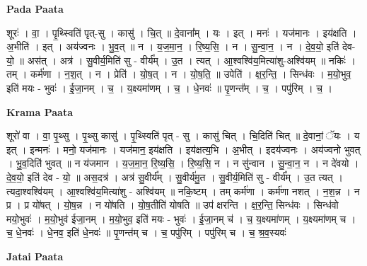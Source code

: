 \documentclass[17pt]{extarticle}
\begin{document}
\textbf{Pada Paata} \newline

शूरः॑ । वा॒ । पृ॒थ्स्विति॑ पृत्-सु । कासु॑ । चि॒त् ॥ दे॒वाना᳚म् । यः । इत् । मनः॑ । यज॑मानः । इय॑क्षति । अ॒भीति॑ । इत् । अय॑ज्वनः । भु॒व॒त् ॥ न । य॒ज॒मा॒न॒ । रि॒ष्य॒सि॒ । न । सु॒न्वा॒न॒ । न । दे॒व॒यो॒ इति॑ देव-यो॒ ॥ अस॑त् । अत्र॑ । सु॒वीर्य॒मिति॑ सु - वीर्य᳚म् । उ॒त । त्यत् । आ॒श्वश्वि॑य॒मित्या॑शु-अश्वि॑यम् ॥ नकिः॑ । तम् । कर्म॑णा । न॒श॒त् । न । प्रेति॑ । यो॒ष॒त् । न । यो॒ष॒ति॒ ॥ उपेति॑ । क्ष॒र॒न्ति॒ । सिन्ध॑वः । म॒यो॒भुव॒ इति॑ मयः - भुवः॑ । ई॒जा॒नम् । च॒ । य॒क्ष्यमा॑णम् । च॒ । धे॒नवः॑ ॥ पृ॒णन्त᳚म् । च॒ । पपु॑रिम् । च॒ ।  \newline


\textbf{Krama Paata} \newline

शूरो॑ वा । वा॒ पृ॒थ्सु । पृ॒थ्सु कासु॑ । पृ॒थ्स्विति॑ पृत् - सु । कासु॑ चित् । चि॒दिति॑ चित् ॥ दे॒वानां॒ ॅयः । य इत् । इन्मनः॑ । मनो॒ यज॑मानः । यज॑मान॒ इय॑क्षति । इय॑क्षत्य॒भि । अ॒भीत् । इदय॑ज्वनः । अय॑ज्वनो भुवत् । भु॒व॒दिति॑ भुवत् ॥ न य॑जमान । य॒ज॒मा॒न॒ रि॒ष्य॒सि॒ । रि॒ष्य॒सि॒ न । न सु॑न्वान । सु॒न्वा॒न॒ न । न दे॑वयो । दे॒व॒यो॒ इति॑ देव - यो॒ ॥ अस॒दत्र॑ । अत्र॑ सु॒वीर्य᳚म् । सु॒वीर्य॑मु॒त । सु॒वीर्य॒मिति॑ सु - वीर्य᳚म् । उ॒त त्यत् । त्यदा॒श्वश्वि॑यम् । आ॒श्वश्वि॑य॒मित्या॑शु - अश्वि॑यम् ॥ नकि॒ष्टम् । तम् कर्म॑णा । कर्म॑णा नशत् । न॒श॒न्न । न प्र । प्र यो॑षत् । यो॒ष॒न्न । न यो॑षति । यो॒ष॒तीति॑ योषति ॥ उप॑ क्षरन्ति । क्ष॒र॒न्ति॒ सिन्ध॑वः । सिन्ध॑वो मयो॒भुवः॑ । म॒यो॒भुव॑ ईजा॒नम् । म॒यो॒भुव॒ इति॑ मयः - भुवः॑ । ई॒जा॒नम् च॑ । च॒ य॒क्ष्यमा॑णम् । य॒क्ष्यमा॑णम् च । च॒ धे॒नवः॑ । धे॒नव॒ इति॑ धे॒नवः॑ ॥ पृ॒णन्त॑म् च । च॒ पपु॑रिम् । पपु॑रिम् च । च॒ श्र॒व॒स्यवः॑ \newline

\textbf{Jatai Paata} \newline
\end{document}
